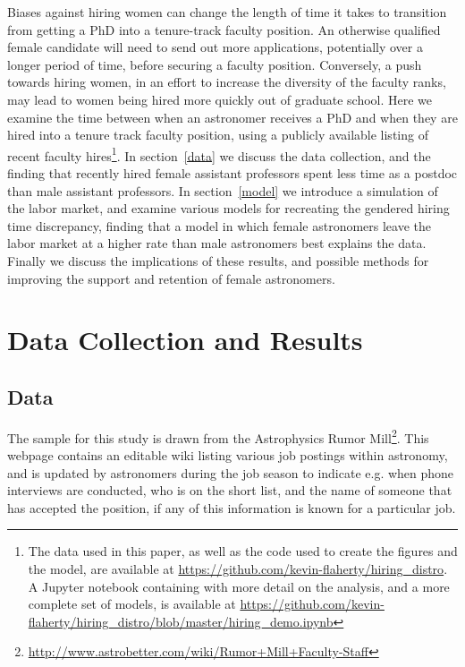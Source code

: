 \documentclass[modern]{aastex62}
\begin{document}
Biases against hiring women can change the length of time it takes to transition from getting a PhD into a tenure-track faculty position. An otherwise qualified female candidate will need to send out more applications, potentially over a longer period of time, before securing a faculty position. Conversely, a push towards hiring women, in an effort to increase the diversity of the faculty ranks, may lead to women being hired more quickly out of graduate school. Here we examine the time between when an astronomer receives a PhD and when they are hired into a tenure track faculty position, using a publicly available listing of recent faculty hires\footnote{The data used in this paper, as well as the code used to create the figures and the model, are available at \url{https://github.com/kevin-flaherty/hiring_distro}. A Jupyter notebook containing with more detail on the analysis, and a more complete set of models, is available at \url{https://github.com/kevin-flaherty/hiring_distro/blob/master/hiring_demo.ipynb}}. In section~\ref{data} we discuss the data collection, and the finding that recently hired female assistant professors spent less time as a postdoc than male assistant professors. In section~\ref{model} we introduce a simulation of the labor market, and examine various models for recreating the gendered hiring time discrepancy, finding that a model in which female astronomers leave the labor market at a higher rate than male astronomers best explains the data. Finally we discuss the implications of these results, and possible methods for improving the support and retention of female astronomers. 

\section{Data Collection and Results\label{data}}

\subsection{Data}
The sample for this study is drawn from the Astrophysics Rumor Mill\footnote{\url{http://www.astrobetter.com/wiki/Rumor+Mill+Faculty-Staff}}. This webpage contains an editable wiki listing various job postings within astronomy, and is updated by astronomers during the job season to indicate e.g. when phone interviews are conducted, who is on the short list, and the name of someone that has accepted the position, if any of this information is known for a particular job. 
\end{document}
